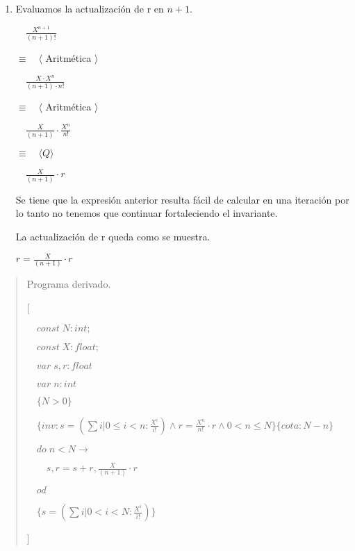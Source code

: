 \documentclass[hidelinks]{article}
\newenvironment{absolutelynopagebreak}
{\Needspace{10\baselineskip}\begin{quote}}
		{\end{quote}}
\begin{document}
\begin{enumerate}
	\item Evaluamos la actualización de r en $n+1$. \par
	      $\quad \frac{X^{n+1}}{(n+1)!}$ \par
	      $\equiv \quad \langle$ Aritmética $ \rangle$ \par
	      $\quad \frac{X \cdot X^n}{(n+1) \cdot n!}$ \par
	      $\equiv \quad \langle$ Aritmética $ \rangle$ \par
	      $\quad \frac{X}{(n+1)} \cdot \frac{X^n}{n!}$ \par
	      $\equiv \quad \langle Q \rangle$ \par
	      $\quad \frac{X}{(n+1)} \cdot r$ \par

	      Se tiene que la expresión anterior resulta fácil de calcular en una iteración
	      por lo tanto no tenemos que continuar fortaleciendo el invariante.\par
	      La actualización de r queda como se muestra.\par

	      \begin{center}
		      $r = \frac{X}{(n+1)} \cdot r$ \par
	      \end{center}

\end{enumerate}

\newpage

\begin{absolutelynopagebreak}
	Programa derivado.\par

	[\par
		$\quad const \; N: int;$\par
		$\quad const \; X: float;$\par
		$\quad var \; s,r: float$\par
		$\quad var \; n: int$\par
		$\quad\{N > 0\}$\par
		$\quad\{inv: s = (\sum i| 0\leq i < n : \frac{X^i}{i!}) \land r = \frac{X^n}{n!} \cdot r \land 0 < n \leq N \}\{cota: N-n\}$\par
		$\quad do \; n < N \rightarrow $ \par
		$\qquad s,r = s + r,\frac{X}{(n+1)} \cdot r $ \par
		$\quad od $ \par
		$\quad \{s = (\sum i| 0 < i < N : \frac{X^i}{i!})\}$ \par
	]
\end{absolutelynopagebreak}
\end{document}
